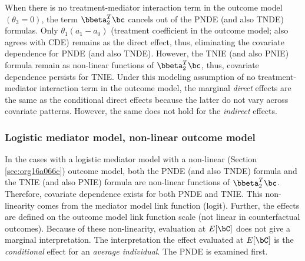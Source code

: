 \documentclass[10pt]{article}
\begin{document}
When there is no treatment-mediator interaction term in the outcome model \((\theta_{3} = 0)\), the term \(\bbeta_{2}^{T}\bc\) cancels out of the PNDE (and also TNDE) formulas. Only \(\theta_{1}(a_{1} - a_{0})\) (treatment coefficient in the outcome model; also agrees with CDE) remains as the direct effect, thus, eliminating the covariate dependence for PNDE (and also TNDE). However, the TNIE (and also PNIE) formula remain as non-linear functions of \(\bbeta_{2}^{T}\bc\), thus, covariate dependence persists for TNIE. Under this modeling assumption of no treatment-mediator interaction term in the outcome model, the marginal \emph{direct} effects are the same as the conditional direct effects because the latter do not vary across covariate patterns. However, the same does not hold for the \emph{indirect} effects.

\subsubsection{Logistic mediator model, non-linear outcome model}
\label{sec:org9e55f26}
In the cases with a logistic mediator model with a non-linear (Section \ref{sec:org16a066c}) outcome model, both the PNDE (and also TNDE) formula and the TNIE (and also PNIE) formula are non-linear functions of \(\bbeta_{2}^{T}\bc\). Therefore, covariate dependence exists for both PNDE and TNIE. This non-linearity comes from the mediator model link function (logit). Further, the effects are defined on the outcome model link function scale (not linear in counterfactual outcomes). Because of these non-linearity, evaluation at \(E[\bC]\) does not give a marginal interpretation. The interpretation the effect evaluated at \(E[\bC]\) is the \emph{conditional} effect for an \emph{average individual}. The PNDE is examined first.
\end{document}
